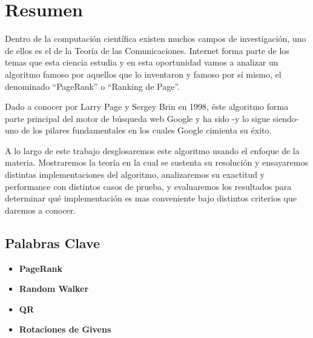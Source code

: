 \section{Resumen}

Dentro de la computación científica existen muchos campos de investigación, uno
de ellos es el de la Teoría de las Comunicaciones. Internet forma parte de los
temas que esta ciencia estudia y en esta oportunidad vamos a analizar un
algoritmo famoso por aquellos que lo inventaron y famoso por sí mismo, el
denominado ``PageRank'' o ``Ranking de Page''.

Dado a conocer por Larry Page y Sergey Brin en 1998, éste algoritmo forma parte principal del motor de búsqueda web Google y ha sido -y lo sigue siendo- uno de los pilares fundamentales en los cuales Google cimienta su éxito.

A lo largo de este trabajo desglosaremos este algoritmo usando el enfoque de la
materia. Mostraremos la teoría en la cual se sustenta su resolución y
ensayaremos distintas implementaciones del algoritmo, analizaremos su exactitud
y performance con distintos casos de prueba, y evaluaremos los resultados para
determinar qué implementación es mas conveniente bajo distintos criterios que
daremos a conocer.

\subsection{Palabras Clave}

\begin{itemize}
    \item \textbf{PageRank}
    \item \textbf{Random Walker}
    \item \textbf{QR}
    \item \textbf{Rotaciones de Givens}
\end{itemize}

